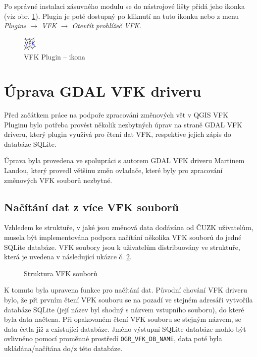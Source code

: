\documentclass[a4paper,12pt,oneside]{book}
\begin{document}
Po správné instalaci zásuvného modulu se do nástrojové lišty přidá jeho ikonka (viz obr. \ref{l_plugin_ikona}). Plugin je poté dostupný po kliknutí na tuto ikonku nebo z menu \textit{Plugins} $\rightarrow$ \textit{VFK} $\rightarrow$ \textit{Otevřít prohlížeč VFK}.

\begin{figure}[H]
\centering
\includegraphics[scale=0.9]{images/vfkPluginIcon.png}
\caption[VFK Plugin -- ikona]{VFK Plugin -- ikona}
\label{l_plugin_ikona}
\end{figure}

\clearpage
\section{Úprava GDAL VFK driveru}
Před začátkem práce na podpoře zpracování změnových vět v QGIS VFK Pluginu bylo potřeba provést několik nezbytných úprav na straně GDAL VFK driveru, který plugin využívá pro čtení dat VFK, respektive jejich zápis do databáze SQLite.

Úprava byla provedena ve spolupráci s autorem GDAL VFK driveru Martinem Landou, který provedl většinu změn ovladače, které byly pro zpracování změnových VFK souborů nezbytné. 

\subsection{Načítání dat z více VFK souborů}
Vzhledem ke struktuře, v jaké jsou změnová data dodávána od ČUZK uživatelům, musela být implementována podpora načítání několika VFK souborů do jedné SQLite databáze. VFK soubory jsou k uživatelům distribuovány ve struktuře, která je uvedena v následující ukázce č. \ref{l_struktura_sireni_vfk}.

\begin{figure}[htbf]
\centering
\begin{minipage}{0.9\textwidth}
\end{minipage}
\caption{Struktura VFK souborů}
\label{l_struktura_sireni_vfk}
\end{figure}

K tomuto byla upravena funkce pro načítání dat. Původní chování VFK driveru bylo, že při prvním čtení VFK souboru se na pozadí ve stejném adresáři vytvořila databáze SQLite (její název byl shodný s názvem vstupního souboru), do které byla data načtena. Při opakovaném čtení VFK souboru se stejným názvem, se data četla již z existující databáze. Jméno výstupní SQLite databáze mohlo být ovlivněno pomocí proměnné prostředí \texttt{OGR\_VFK\_DB\_NAME}, data poté byla ukládána/načítána do/z této databáze. 
\end{document}
